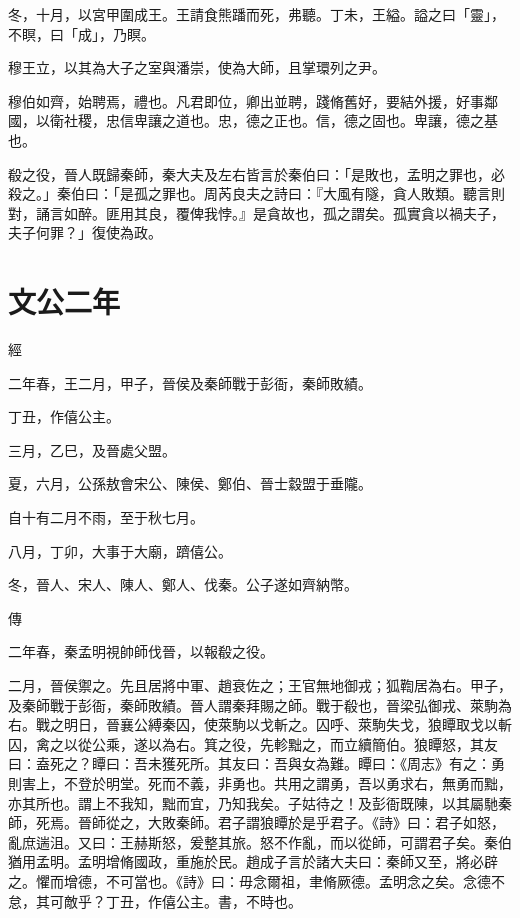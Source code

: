 \documentclass{ctexart}
\begin{document}
冬，十月，以宮甲圍成王。王請食熊蹯而死，弗聽。丁未，王縊。謚之曰「靈」，不瞑，曰「成」，乃瞑。

穆王立，以其為大子之室與潘崇，使為大師，且掌環列之尹。

穆伯如齊，始聘焉，禮也。凡君即位，卿出並聘，踐脩舊好，要結外援，好事鄰國，以衛社稷，忠信卑讓之道也。忠，德之正也。信，德之固也。卑讓，德之基也。

殽之役，晉人既歸秦師，秦大夫及左右皆言於秦伯曰：「是敗也，孟明之罪也，必殺之。」秦伯曰：「是孤之罪也。周芮良夫之詩曰：『大風有隧，貪人敗類。聽言則對，誦言如醉。匪用其良，覆俾我悖。』是貪故也，孤之謂矣。孤實貪以禍夫子，夫子何罪？」復使為政。





\section{文公二年}


經



二年春，王二月，甲子，晉侯及秦師戰于彭衙，秦師敗績。

丁丑，作僖公主。

三月，乙巳，及晉處父盟。

夏，六月，公孫敖會宋公、陳侯、鄭伯、晉士縠盟于垂隴。

自十有二月不雨，至于秋七月。

八月，丁卯，大事于大廟，躋僖公。

冬，晉人、宋人、陳人、鄭人、伐秦。公子遂如齊納幣。

傳



二年春，秦孟明視帥師伐晉，以報殽之役。

二月，晉侯禦之。先且居將中軍、趙衰佐之；王官無地御戎；狐鞫居為右。甲子，及秦師戰于彭衙，秦師敗績。晉人謂秦拜賜之師。戰于殽也，晉梁弘御戎、萊駒為右。戰之明日，晉襄公縛秦囚，使萊駒以戈斬之。囚呼、萊駒失戈，狼瞫取戈以斬囚，禽之以從公乘，遂以為右。箕之役，先軫黜之，而立續簡伯。狼瞫怒，其友曰：盍死之？瞫曰：吾未獲死所。其友曰：吾與女為難。瞫曰：《周志》有之：勇則害上，不登於明堂。死而不義，非勇也。共用之謂勇，吾以勇求右，無勇而黜，亦其所也。謂上不我知，黜而宜，乃知我矣。子姑待之！及彭衙既陳，以其屬馳秦師，死焉。晉師從之，大敗秦師。君子謂狼瞫於是乎君子。《詩》曰：君子如怒，亂庶遄沮。又曰：王赫斯怒，爰整其旅。怒不作亂，而以從師，可謂君子矣。秦伯猶用孟明。孟明增脩國政，重施於民。趙成子言於諸大夫曰：秦師又至，將必辟之。懼而增德，不可當也。《詩》曰：毋念爾祖，聿脩厥德。孟明念之矣。念德不怠，其可敵乎？丁丑，作僖公主。書，不時也。
\end{document}
